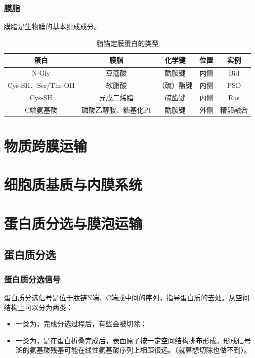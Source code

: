 \subsubsection{膜脂}

膜脂是生物膜的基本组成成分。

\begin{table}[htbp]
	\centering
	\begin{tabularx}{\textwidth}{|C|c|c|c|c|}
		\hline
		蛋白 & 膜脂 & 化学键 & 位置 & 实例 \\ \hline
		N-Gly & 豆蔻酸 & 酰胺键 & 内侧 & Bid \\ \hline
		Cys-SH、Ser/Thr-OH & 软脂酸 & （硫）酯键 & 内侧 & PSD\footnotemark \\ \hline
		Cys-SH & 异戊二烯脂 & 硫酯键 & 内侧 & Ras \\ \hline
		C端氨基酸 & 磷酸乙醇胺、糖基化PI & 酰胺键 & 外侧 & 精卵融合 \\ \hline
	\end{tabularx}
	\caption{脂锚定膜蛋白的类型}
	\label{tab:脂锚定膜蛋白的类型}
\end{table}




\section{物质跨膜运输}

\section{细胞质基质与内膜系统}

\section{蛋白质分选与膜泡运输}

\subsection{蛋白质分选}

\subsubsection{蛋白质分选信号}

蛋白质分选信号是位于肽链N端、C端或中间的序列，指导蛋白质的去处。从空间结构上可以分为两类：

\begin{itemize}
	\item 一类为，完成分选过程后，有些会被切除；
	\item 一类为，是在蛋白折叠完成后，表面原子按一定空间结构排布形成。形成信号斑的氨基酸残基可能在线性氨基酸序列上相距很远。（就算想切除也做不到）。
\end{itemize}

